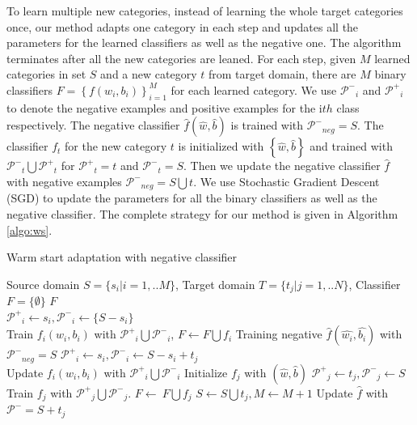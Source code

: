 To learn multiple new categories, instead of learning the whole target categories once, our method adapts one category in each step and updates all the parameters for the learned classifiers as well as the negative one. The algorithm terminates after all the new categories are leaned.  
For each step, given $M$ learned categories in set $S$ and a new category $t$ from target domain, there are $M$ binary classifiers $F=\left\{ {{f}\left( {{w_i},{b_i}} \right)} \right\}_{i = 1}^M$ for each learned category. We use $\mathcal{P^-}_i$ and $\mathcal{P^+}_i$ to denote the negative examples and positive examples for the i$th$ class respectively. The negative classifier $\hat{f}(\hat{w},\hat{b})$ is trained with $\mathcal{P^-}_{neg}=S$. The classifier $f_t$ for the new category $t$ is initialized with $\left\{\hat{w},\hat{b}\right\}$ and trained with $\mathcal{P^-}_t\bigcup\mathcal{P^+}_t$ for $\mathcal{P^+}_t=t$ and $\mathcal{P^-}_t=S$. Then we update the negative classifier $\hat{f}$ with negative examples $\mathcal{P^-}_{neg}=S\bigcup t$. We use Stochastic Gradient Descent (SGD) to update the parameters for all the binary classifiers as well as the negative classifier. The complete strategy for our method is given in Algorithm \ref{algo:ws}.
\begin{algorithm}
  \caption{Warm start adaptation with negative classifier}\label{algo:ws}
  \begin{algorithmic}[1]
    \REQUIRE Source domain $S = \{ {s_i}|i = 1,..M\} $, Target domain $T = \{ {t_j}|j = 1,..N\} $, Classifier $F = \{\emptyset\}$
    \ENSURE $F$\\
         \STATE $\mathcal{P^+}_i \leftarrow s_i, \mathcal{P^-}_i\leftarrow \{S-s_i\}$\\
          Train ${{f_i}\left( {{w_i},{b_i}} \right)}$ with $\mathcal{P^+}_i\bigcup\mathcal{P^-}_i$, $F\leftarrow F\bigcup f_i$
    \ENDFOR
    \STATE Training negative $\hat{f}\left( {\hat{w_i},\hat{b_i}} \right)$ with $\mathcal{P^-}_{neg}=S$
             \STATE $\mathcal{P^+}_i \leftarrow s_i, \mathcal{P^-}_i \leftarrow S-s_i+t_j$ \\
              Update ${{f_i}\left( {{w_i},{b_i}} \right)}$ with $\mathcal{P^+}_i\bigcup\mathcal{P^-}_i$
        \ENDFOR
        \STATE Initialize $f_j$ with $(\hat{w},\hat{b})$ 
        \STATE $\mathcal{P^+}_j \leftarrow t_j, \mathcal{P^-}_j\leftarrow S$
        \STATE Train $f_j$ with $\mathcal{P^+}_j\bigcup\mathcal{P^-}_j$.
        \STATE $F\leftarrow\ F\bigcup f_j$
        \STATE $S\leftarrow S\bigcup t_j, M\leftarrow M+1$
        \STATE Update $\hat{f}$ with $\mathcal{P^-}=S+t_j$
     \ENDWHILE
  \end{algorithmic}
\end{algorithm}
